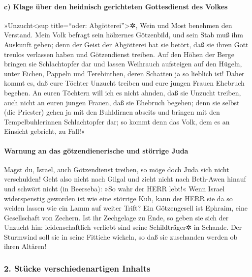 \hypertarget{c-klage-uxfcber-den-heidnisch-gerichteten-gottesdienst-des-volkes}{%
\paragraph{c) Klage über den heidnisch gerichteten Gottesdienst des
Volkes}\label{c-klage-uxfcber-den-heidnisch-gerichteten-gottesdienst-des-volkes}}

 »Unzucht\textless sup title=``oder:
Abgötterei''\textgreater✲, Wein und Most benehmen den Verstand.
 Mein Volk befragt sein hölzernes Götzenbild, und sein
Stab muß ihm Auskunft geben; denn der Geist der Abgötterei hat sie
betört, daß sie ihren Gott treulos verlassen haben und Götzendienst
treiben.  Auf den Höhen der Berge bringen sie
Schlachtopfer dar und lassen Weihrauch aufsteigen auf den Hügeln, unter
Eichen, Pappeln und Terebinthen, deren Schatten ja so lieblich ist!
Daher kommt es, daß eure Töchter Unzucht treiben und eure jungen Frauen
Ehebruch begehen.  An euren Töchtern will ich es nicht
ahnden, daß sie Unzucht treiben, auch nicht an euren jungen Frauen, daß
sie Ehebruch begehen; denn sie selbst (die Priester) gehen ja mit den
Buhldirnen abseits und bringen mit den Tempelbuhlerinnen Schlachtopfer
dar; so kommt denn das Volk, dem es an Einsicht gebricht, zu Fall!«

\hypertarget{warnung-an-das-guxf6tzendienerische-und-stuxf6rrige-juda}{%
\paragraph{Warnung an das götzendienerische und störrige
Juda}\label{warnung-an-das-guxf6tzendienerische-und-stuxf6rrige-juda}}

 Magst du, Israel, auch Götzendienst treiben, so möge
doch Juda sich nicht verschulden! Geht also nicht nach Gilgal und zieht
nicht nach Beth-Awen hinauf und schwört nicht (in Beerseba): »So wahr
der HERR lebt!«  Wenn Israel widerspenstig geworden ist
wie eine störrige Kuh, kann der HERR sie da so weiden lassen wie ein
Lamm auf weiter Trift?  Ein Götzengesell ist Ephraim,
eine Gesellschaft von Zechern.  Ist ihr Zechgelage zu
Ende, so geben sie sich der Unzucht hin: leidenschaftlich verliebt sind
seine Schildträger✲ in Schande.  Der Sturmwind soll sie
in seine Fittiche wickeln, so daß sie zuschanden werden ob ihren
Altären!

\hypertarget{stuxfccke-verschiedenartigen-inhalts}{%
\subsubsection{2. Stücke verschiedenartigen
Inhalts}\label{stuxfccke-verschiedenartigen-inhalts}}

